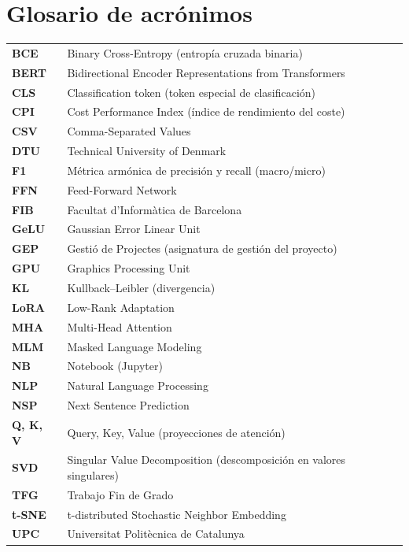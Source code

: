 \documentclass[11pt, a4paper]{article}
\begin{document}
\newpage
\tableofcontents
\newpage
\listoffigures
\newpage
\listoftables
\newpage

\section*{Glosario de acrónimos}
\begin{tabular}{@{}ll@{}}
    \textbf{BCE}    & Binary Cross-Entropy (entropía cruzada binaria) \\
    \textbf{BERT}   & Bidirectional Encoder Representations from Transformers \\
    \textbf{CLS}    & Classification token (token especial de clasificación) \\
    \textbf{CPI}    & Cost Performance Index (índice de rendimiento del coste) \\
    \textbf{CSV}    & Comma-Separated Values \\
    \textbf{DTU}    & Technical University of Denmark \\
    \textbf{F1}     & Métrica armónica de precisión y recall (macro/micro) \\
    \textbf{FFN}    & Feed-Forward Network \\
    \textbf{FIB}    & Facultat d'Informàtica de Barcelona \\
    \textbf{GeLU}   & Gaussian Error Linear Unit \\
    \textbf{GEP}    & Gestió de Projectes (asignatura de gestión del proyecto) \\
    \textbf{GPU}    & Graphics Processing Unit \\
    \textbf{KL}     & Kullback--Leibler (divergencia) \\
    \textbf{LoRA}   & Low-Rank Adaptation \\
    \textbf{MHA}    & Multi-Head Attention \\
    \textbf{MLM}    & Masked Language Modeling \\
    \textbf{NB}     & Notebook (Jupyter) \\
    \textbf{NLP}    & Natural Language Processing \\
    \textbf{NSP}    & Next Sentence Prediction \\
    \textbf{Q, K, V} & Query, Key, Value (proyecciones de atención) \\
    \textbf{SVD}    & Singular Value Decomposition (descomposición en valores singulares) \\
    \textbf{TFG}    & Trabajo Fin de Grado \\
    \textbf{t-SNE}  & t-distributed Stochastic Neighbor Embedding \\
    \textbf{UPC}    & Universitat Politècnica de Catalunya \\
\end{tabular}
\newpage
\end{document}
